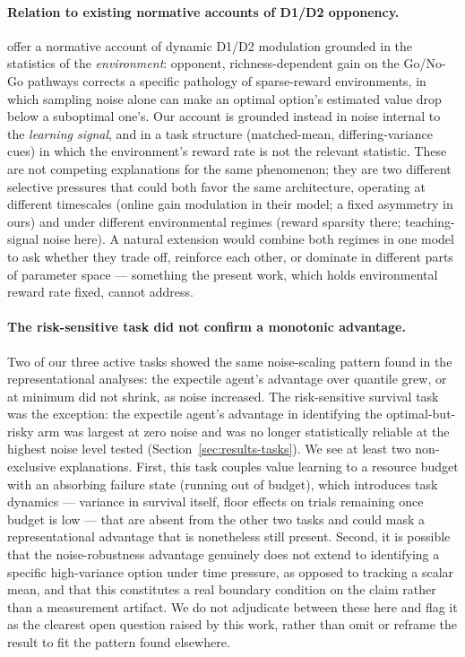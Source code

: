 \documentclass[11pt]{article}
\begin{document}
\paragraph{Relation to existing normative accounts of D1/D2 opponency.} \citet{jaskirfrank2023} offer a normative account of dynamic D1/D2 modulation grounded in the statistics of the \emph{environment}: opponent, richness-dependent gain on the Go/No-Go pathways corrects a specific pathology of sparse-reward environments, in which sampling noise alone can make an optimal option's estimated value drop below a suboptimal one's. Our account is grounded instead in noise internal to the \emph{learning signal}, and in a task structure (matched-mean, differing-variance cues) in which the environment's reward rate is not the relevant statistic. These are not competing explanations for the same phenomenon; they are two different selective pressures that could both favor the same architecture, operating at different timescales (online gain modulation in their model; a fixed asymmetry in ours) and under different environmental regimes (reward sparsity there; teaching-signal noise here). A natural extension would combine both regimes in one model to ask whether they trade off, reinforce each other, or dominate in different parts of parameter space --- something the present work, which holds environmental reward rate fixed, cannot address.

\paragraph{The risk-sensitive task did not confirm a monotonic advantage.} Two of our three active tasks showed the same noise-scaling pattern found in the representational analyses: the expectile agent's advantage over quantile grew, or at minimum did not shrink, as noise increased. The risk-sensitive survival task was the exception: the expectile agent's advantage in identifying the optimal-but-risky arm was largest at zero noise and was no longer statistically reliable at the highest noise level tested (Section~\ref{sec:results-tasks}). We see at least two non-exclusive explanations. First, this task couples value learning to a resource budget with an absorbing failure state (running out of budget), which introduces task dynamics --- variance in survival itself, floor effects on trials remaining once budget is low --- that are absent from the other two tasks and could mask a representational advantage that is nonetheless still present. Second, it is possible that the noise-robustness advantage genuinely does not extend to identifying a specific high-variance option under time pressure, as opposed to tracking a scalar mean, and that this constitutes a real boundary condition on the claim rather than a measurement artifact. We do not adjudicate between these here and flag it as the clearest open question raised by this work, rather than omit or reframe the result to fit the pattern found elsewhere.
\end{document}
